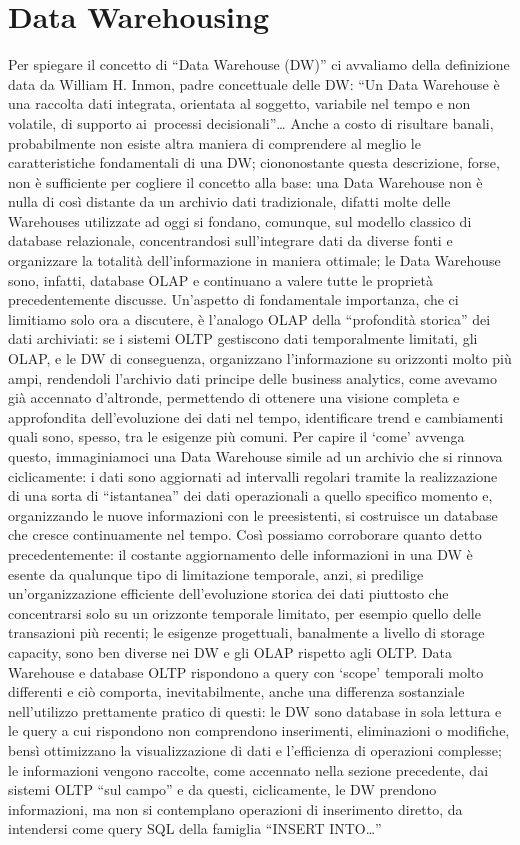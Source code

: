\documentclass[a4paper,12pt]{report}
\begin{document}
\section{Data Warehousing}
Per spiegare il concetto di “Data Warehouse (DW)” ci avvaliamo della definizione data da William H. Inmon, padre concettuale delle DW: 
“Un Data Warehouse è una raccolta dati integrata, orientata al soggetto, variabile nel tempo e non volatile, di supporto ai processi decisionali”…
Anche a costo di risultare banali, probabilmente non esiste altra maniera di comprendere al meglio le caratteristiche fondamentali di una DW; ciononostante questa descrizione, forse, non è sufficiente per cogliere il concetto alla base: una Data Warehouse non è nulla di così distante da un archivio dati tradizionale, difatti molte delle Warehouses utilizzate ad oggi si fondano, comunque, sul modello classico di database relazionale, concentrandosi sull’integrare dati da diverse fonti e organizzare la totalità dell’informazione in maniera ottimale; le Data Warehouse sono, infatti, database OLAP e continuano a valere tutte le proprietà precedentemente discusse. Un’aspetto di fondamentale importanza, che ci limitiamo solo ora a discutere, è l’analogo OLAP della “profondità storica” dei dati archiviati: se i sistemi OLTP gestiscono dati temporalmente limitati, gli OLAP, e le DW di conseguenza, organizzano l’informazione su orizzonti molto più ampi, rendendoli l’archivio dati principe delle business analytics, come avevamo già accennato d’altronde, permettendo di ottenere una visione completa e approfondita dell’evoluzione dei dati nel tempo, identificare trend e cambiamenti quali sono, spesso, tra le esigenze più comuni. Per capire il ‘come’ avvenga questo, immaginiamoci una Data Warehouse simile ad un archivio che si rinnova ciclicamente: i dati sono aggiornati ad intervalli regolari tramite la realizzazione di una sorta di “istantanea” dei dati operazionali a quello specifico momento e, organizzando le nuove informazioni con le preesistenti, si costruisce un database che cresce continuamente nel tempo. Così possiamo corroborare quanto detto precedentemente: il costante aggiornamento delle informazioni in una DW è esente da qualunque tipo di limitazione temporale, anzi, si predilige un’organizzazione efficiente dell’evoluzione storica dei dati piuttosto che concentrarsi solo su un orizzonte temporale limitato, per esempio quello delle transazioni più recenti; le esigenze progettuali, banalmente a livello di storage capacity, sono ben diverse nei DW e gli OLAP rispetto agli OLTP. Data Warehouse e database OLTP rispondono a query con ‘scope’ temporali molto differenti e ciò comporta, inevitabilmente, anche una differenza sostanziale nell’utilizzo prettamente pratico di questi: le DW sono database in sola lettura e le query a cui rispondono non comprendono inserimenti, eliminazioni o modifiche, bensì ottimizzano la visualizzazione di dati e l’efficienza di operazioni complesse; le informazioni vengono raccolte, come accennato nella sezione precedente, dai sistemi OLTP “sul campo” e da questi, ciclicamente, le DW prendono informazioni, ma non si contemplano operazioni di inserimento diretto, da intendersi come query SQL della famiglia “INSERT INTO…”
\end{document}
